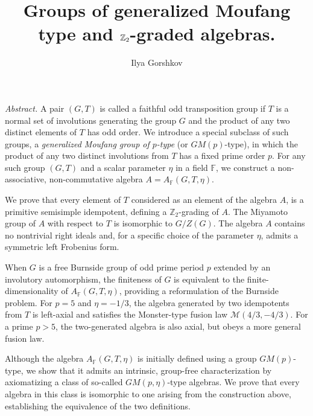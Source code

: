 \documentclass[12pt]{article}
\title{Groups of generalized Moufang type and $\Z_2$-graded algebras.}
\author{Ilya Gorshkov }
\date{ }
\newcommand\F{\mathbb{F}}
\newcommand\Z{\mathbb{Z}}
\begin{document}
\maketitle
\textit{Abstract.}
 A pair $(G,T)$ is called a faithful odd transposition group if $T$ is a normal set of involutions generating the group $G$ and the product of any two distinct elements of $T$ has odd order. We introduce a special subclass of such groups, a \emph{generalized Moufang group of $p$-type} (or $GM(p)$-type), in which the product of any two distinct involutions from $T$ has a fixed prime order $p$. For any such group $(G,T)$ and a scalar parameter $\eta$ in a field $\F$, we construct a non-associative, non-commutative algebra $A = A_{\F}(G,T,\eta)$.

We prove that every element of $T$ considered as an element of the algebra $A$, is a primitive semisimple idempotent, defining a $\Z_{2}$-grading of $A$. The Miyamoto group of $A$ with respect to $T$ is isomorphic to $G/Z(G)$. The algebra $A$ contains no nontrivial right ideals and, for a specific choice of the parameter $\eta$, admits a symmetric left Frobenius form.

When $G$ is a free Burnside group of odd prime period \(p\) extended by an involutory automorphism, the finiteness of $G$ is equivalent to the finite-dimensionality of $A_{\F}(G,T,\eta)$,  providing a reformulation of the Burnside problem. For $p=5$ and $\eta=-1/3$, the algebra generated by two idempotents from $T$ is left-axial and satisfies the Monster-type fusion law $\mathcal{M}(4/3, -4/3)$. For a prime $p>5$, the two-generated algebra is also axial, but obeys a more general fusion law.

Although the algebra $A_{\F}(G,T,\eta)$ is initially defined using a group $GM(p)$-type, we show that it admits an intrinsic, group-free characterization by axiomatizing a class of so-called $GM(p,\eta)$-type algebras. We prove that every algebra in this class is isomorphic to one arising from the construction above, establishing the equivalence of the two definitions.
\end{document}
